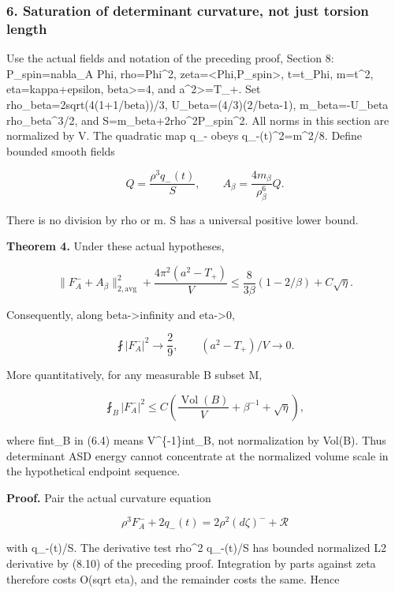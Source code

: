 \documentclass[
  10pt,
]{article}
\begin{document}
\hypertarget{saturation-of-determinant-curvature-not-just-torsion-length}{%
\subsubsection{6. Saturation of determinant curvature, not just torsion
length}\label{saturation-of-determinant-curvature-not-just-torsion-length}}

Use the actual fields and notation of the preceding proof, Section 8:
P\_spin=nabla\_A Phi, rho=\textbar Phi\textbar\^{}2,
zeta=\textless Phi,P\_spin\textgreater, t=t\_Phi,
m=\textbar t\textbar\^{}2, eta=kappa+epsilon, beta\textgreater=4, and
a\^{}2\textgreater=T\_+. Set rho\_beta=2sqrt(4(1+1/beta))/3,
U\_beta=(4/3)(2/beta-1), m\_beta=-U\_beta rho\_beta\^{}3/2, and
S=m\_beta+2rho\^{}2\textbar P\_spin\textbar\^{}2. All norms in this
section are normalized by V. The quadratic map q\_- obeys
\textbar q\_-(t)\textbar\^{}2=m\^{}2/8. Define bounded smooth fields

\[
 Q=\frac{\rho^3q_-(t)}S,\qquad
 A_\beta=\frac{4m_\beta}{\rho_\beta^6}Q.                \tag{6.1}
\]

There is no division by rho or m. S has a universal positive lower
bound.

\textbf{Theorem 4.} Under these actual hypotheses,

\[
 \boxed{\|F_A^-+A_\beta\|_{2,\mathrm{avg}}^2
       +\frac{4\pi^2(a^2-T_+)}V
       \le\frac8{3\beta}(1-2/\beta)+C\sqrt\eta.}       \tag{6.2}
\]

Consequently, along beta-\textgreater infinity and eta-\textgreater0,

\[
 \fint|F_A^-|^2\longrightarrow\frac29,
 \qquad (a^2-T_+)/V\longrightarrow0.                   \tag{6.3}
\]

More quantitatively, for any measurable B subset M,

\[
 \fint_B|F_A^-|^2\le
 C\left(\frac{\operatorname{Vol}(B)}V+\beta^{-1}
                                      +\sqrt\eta\right),        \tag{6.4}
\]

where fint\_B in (6.4) means V\^{}\{-1\}int\_B, not normalization by
Vol(B). Thus determinant ASD energy cannot concentrate at the normalized
volume scale in the hypothetical endpoint sequence.

\textbf{Proof.} Pair the actual curvature equation

\[
 \rho^3F_A^-+2q_-(t)=2\rho^2(d\zeta)^-+\mathcal R
\]

with q\_-(t)/S. The derivative test rho\^{}2 q\_-(t)/S has bounded
normalized L2 derivative by (8.10) of the preceding proof. Integration
by parts against zeta therefore costs O(sqrt eta), and the remainder
costs the same. Hence
\end{document}
